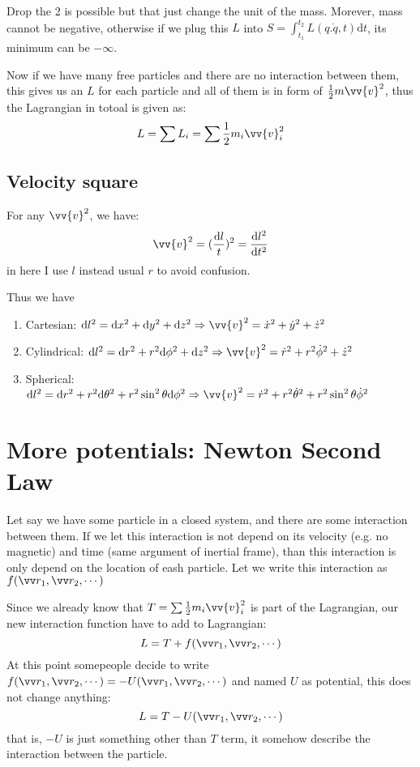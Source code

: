 \documentclass{article}
\newcommand{\de}{\mathrm{d}}
\begin{document}
Drop the 2 is possible but that just change the unit of the mass. Morever, mass cannot be negative, otherwise if we plug this $L$ into $S = \int_{t_1}^{t_2} L(q.\dot q, t) \de t$, its minimum can be $-\infty$.

Now if we have many free particles and there are no interaction between them, this gives us an $L$ for each particle and all of them is in form of $\frac{1}{2} m \vv{v}^2$, thus the Lagrangian in totoal is given as:
\[
L = \sum L_i = \sum \frac{1}{2} m_i \vv{v}^2_i
\]

\subsection{Velocity square}
For any $\vv{v}^2$, we have:
\[
\vv{v}^2 = (\frac{\de l}{t})^2 = \frac{\de l^2}{\de t^2}
\]
in here I use $l$ instead usual $r$ to avoid confusion.

Thus we have
\begin{enumerate}
    \item Cartesian: $\de l^2 = \de x^2 + \de y^2 + \de z^2 \Rightarrow \vv{v}^2 = \dot{x}^2 + \dot y ^2 + \dot z ^2$
    \item Cylindrical: $\de l^2 = \de r^2 + r^2 \de \phi^2 + \de z^2 \Rightarrow \vv{v}^2 = \dot r^2 + r^2 \dot \phi^2 + \dot z ^2$
    \item Spherical: $\de l^2 = \de r^2+r^2\de \theta^2 + r^2\sin^2\theta\de \phi^2 \Rightarrow \vv{v}^2 = \dot r^2 + r^2\dot\theta^2+r^2\sin^2\theta\dot \phi^2$
\end{enumerate}

\section{More potentials: Newton Second Law}
Let say we have some particle in a closed system, and there are some interaction between them. If we let this interaction is not depend on its velocity (e.g. no magnetic) and time (same argument of inertial frame), than this interaction is only depend on the location of eash particle. Let we write this interaction as $f(\vv r_1, \vv r_2, \cdots)$

Since we already know that $T = \sum \frac{1}{2} m_i \vv{v}^2_i$ is part of the Lagrangian, our new interaction function have to add to Lagrangian:
\[
L = T + f(\vv r_1, \vv r_2, \cdots)
\]
At this point somepeople decide to write $f(\vv r_1, \vv r_2, \cdots) = - U(\vv r_1, \vv r_2, \cdots)$ and named $U$ as potential, this does not change anything:
\[
L = T - U(\vv r_1, \vv r_2, \cdots)
\]
that is, $-U$ is just something other than $T$ term, it somehow describe the interaction between the particle.
\end{document}
